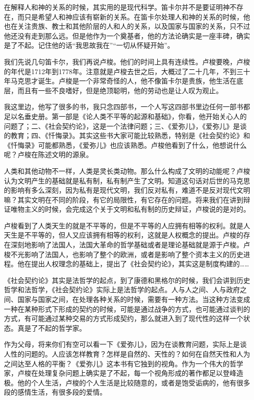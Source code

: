 \documentclass[UTF8, 12pt, a4paper]{ctexrep}
\begin{document}
在解释人和神的关系的时候，其实用的是现代科学。笛卡尔并不是要证明神不存在，而只是希望人和神应该有崭新的关系。在笛卡尔处理人和神的关系的时候，他也在关注贵族、教士和其他阶层的人和人的关系，以及国家与国家的关系，只不过他还没有走到那么远。但是他作为一个奠基者，他的方法论确实是一座丰碑，确实是了不起。记住他的话“我思故我在”“一切从怀疑开始”。

我们先说几句笛卡尔，我们再说卢梭。他们的时间上具有连续性。卢梭要晚，卢梭的年代是1712年到1778年。注意就是卢梭去世之后，大概过了二十几年，不到三十年马克思才诞生。卢梭是一个非常奇怪的人，他不像笛卡尔是贵族，他生活在底层，而且有一些不良嗜好，但是绝顶聪明，他的劳动也是让人叹为观止。

我这里边，他写了很多的书，我只念四部书，一个人写这四部书里边任何一部书都足以名垂史册。第一部是《论人类不平等的起源和基础》，你看，他开始关心人的问题了；二、《社会契约论》，这是一个法律问题；三、《爱弥儿》，《爱弥儿》是谈的教育；四、《忏悔录》。其实这些书大家可能比较熟悉，特别是《社会契约论》和《忏悔录》可能都熟悉，《爱弥儿》也应该熟悉。卢梭他看到了什么，他想说什么呢？卢梭在陈述文明的源泉。

人类和其他动物不一样，人类是灵长类动物。那么什么构成了文明的动能呢？卢梭认为文明产生的基础就是私有制，私有制产生了文明。知道这句话对后世的马克思的影响有多么深刻，因为私有是现代文明，我们反对私有，难道不是反对现代文明嘛？其实文明在不同的阶段，有它的局限性，有它存在的问题。将来我们在讲到辩证唯物主义的时候，会完成这个关于文明和私有制的历史辩证，卢梭说的是对的。

卢梭看到了人类天生的就是不平等的，但是不平等的人应拥有相等的权利。就是人天生是不平等的，但人又应该拥有相等的权利，这就是人权概念的提出。卢梭的存在深刻地影响了法国人，法国大革命的哲学基础或者是理论基础就是源于卢梭。卢梭不光影响了法国人，也影响了整个的欧洲，或者是影响了整个资本主义的历史进程。他在提出人权理念的基础上，提出了《社会契约论》，其实这是制度构建的……

《社会契约论》其实是法哲学的起点，到了康德和黑格尔的时候，我们会讲到历史哲学和法哲学，《社会契约论》实际上是法哲学的起点。人与人之间、人与政府之间、国家与国家之间，在处理各种关系的时候，需要有一种方法。当这种方法变成一种在某种形式下形成的契约的时候，可能是通过战争的方式，也可能通过谈判的方式，有可能通过某种交易的方式形成契约，那么就进入到了现代性的这样一个状态。真是了不起的哲学家。

作为父母，将来你们有空可以看一下《爱弥儿》，因为在谈教育问题，实际上是谈人性的问题的。人应该怎样教育？怎样是自然的、天性的？如何在自然天性和人为之间达至人格的平衡？《爱弥儿》这本书有它独到的视角。作为一个伟大的哲学家，卢梭在处理复杂问题上确实是了不起，每一个视角形成的著作都足以登峰造极。他的个人生活，卢梭的个人生活是比较随意的，或者是饱受诟病的，他有很多段的感情生活，有很多段的爱情。
\end{document}
